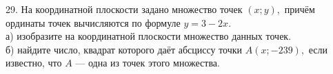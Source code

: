 29. На координатной плоскости задано множество точек $(x;y),$ причём ординаты точек вычисляются по формуле $y=3-2x.$\\
а) изобразите на координатной плоскости множество данных точек.\\
б) найдите число, квадрат которого даёт абсциссу точки $A(x;-239),$ если известно, что $A$ --- одна из точек этого множества.\\
